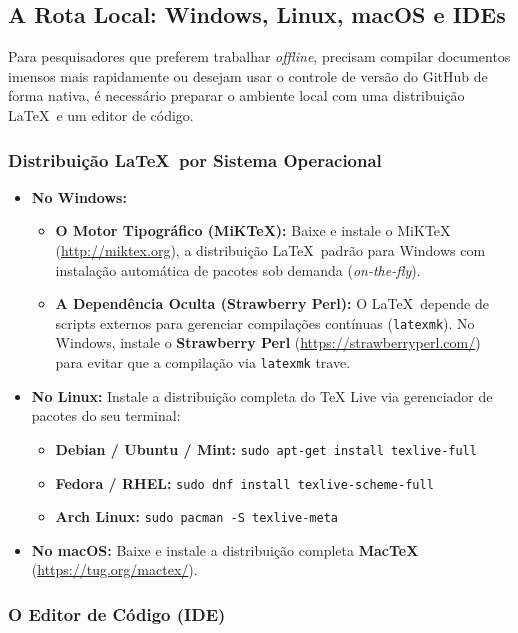 \documentclass[12pt, a4paper]{article}
\begin{document}
\subsection{A Rota Local: Windows, Linux, macOS e IDEs}

Para pesquisadores que preferem trabalhar \textit{offline}, precisam compilar documentos imensos mais rapidamente ou desejam usar o controle de versão do GitHub de forma nativa, é necessário preparar o ambiente local com uma distribuição \LaTeX \ e um editor de código.

\subsubsection{Distribuição \LaTeX \ por Sistema Operacional}

\begin{itemize}
    \item \textbf{No Windows:}
    \begin{itemize}
        \item \textbf{O Motor Tipográfico (MiKTeX):} Baixe e instale o MiKTeX (\url{http://miktex.org}), a distribuição \LaTeX \ padrão para Windows com instalação automática de pacotes sob demanda (\textit{on-the-fly}).
        \item \textbf{A Dependência Oculta (Strawberry Perl):} O \LaTeX \ depende de scripts externos para gerenciar compilações contínuas (\texttt{latexmk}). No Windows, instale o \textbf{Strawberry Perl} (\url{https://strawberryperl.com/}) para evitar que a compilação via \texttt{latexmk} trave.
    \end{itemize}
    \item \textbf{No Linux:} Instale a distribuição completa do TeX Live via gerenciador de pacotes do seu terminal:
    \begin{itemize}
        \item \textbf{Debian / Ubuntu / Mint:} \texttt{sudo apt-get install texlive-full}
        \item \textbf{Fedora / RHEL:} \texttt{sudo dnf install texlive-scheme-full}
        \item \textbf{Arch Linux:} \texttt{sudo pacman -S texlive-meta}
    \end{itemize}
    \item \textbf{No macOS:} Baixe e instale a distribuição completa \textbf{MacTeX} (\url{https://tug.org/mactex/}).
\end{itemize}

\subsubsection{O Editor de Código (IDE)}
\end{document}
